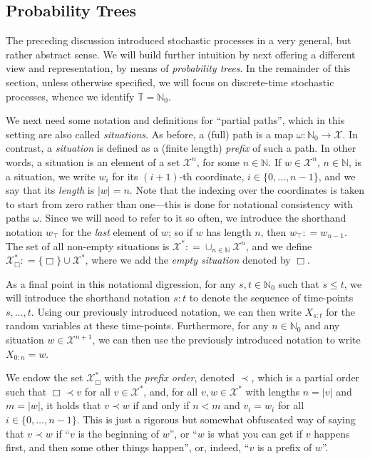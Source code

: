\documentclass[graybox]{svmult}
\newcommand{\nats}{\mathbb{N}}
\newcommand{\natswith}{\nats_{0}}
\newcommand{\states}{\mathcal{X}}
\newcommand{\coloneqq}{:\!=}
\newcommand{\timedim}{\mathbb{T}}
\begin{document}
\subsection{Probability Trees}\label{sec:prob_trees}

The preceding discussion introduced stochastic processes in a very general, but rather abstract sense. We will build further intuition by next offering a different view and representation, by means of \emph{probability trees}. In the remainder of this section, unless otherwise specified, we will focus on discrete-time stochastic processes, whence we identify $\timedim=\natswith$.

We next need some notation and definitions for ``partial paths'', which in this setting are also called \emph{situations}. As before, a (full) path is a map $\omega:\natswith\to\states$. In contrast, a \emph{situation} is defined as a (finite length) \emph{prefix} of such a path. In other words, a situation is an element of a set $\states^{n}$, for some $n\in\nats$. If $w\in\states^n$, $n\in\nats$, is a situation, we write $w_i$ for its $(i+1)$-th coordinate, $i\in\{0,\ldots,n-1\}$, and we say that its \emph{length} is $\lvert w\rvert=n$. Note that the indexing over the coordinates is taken to start from zero rather than one---this is done for notational consistency with paths $\omega$. Since we will need to refer to it so often, we introduce the shorthand notation $w_\top$ for the \emph{last} element of $w$; so if $w$ has length $n$, then $w_\top\coloneqq w_{n-1}$. The set of all non-empty situations is $\states^*\coloneqq \cup_{n\in\nats}\states^n$, and we define $\states^*_\Box\coloneqq \{\Box\}\cup\states^*$, where we add the \emph{empty situation} denoted by $\Box$.

As a final point in this notational digression, for any $s,t\in\natswith$ such that $s\leq t$, we will introduce the shorthand notation $s:t$ to denote the sequence of time-points $s,\ldots,t$. Using our previously introduced notation, we can then write $X_{s:t}$ for the random variables at these time-points. Furthermore, for any $n\in\natswith$ and any situation $w\in\states^{n+1}$, we can then use the previously introduced notation to write $X_{0:n}=w$.

We endow the set $\states^*_\Box$ with the \emph{prefix order}, denoted $\prec$, which is a partial order such that $\Box\prec v$ for all $v\in\states^*$, and, for all $v,w\in\states^*$ with lengths $n=\lvert v\rvert$ and $m=\lvert w\rvert$, it holds that $v\prec w$ if and only if $n<m$ and $v_i=w_i$ for all $i\in\{0,\ldots,n-1\}$. This is just a rigorous but somewhat obfuscated way of saying that $v\prec w$ if ``$v$ is the beginning of $w$'', or ``$w$ is what you can get if $v$ happens first, and then some other things happen'', or, indeed, ``$v$ is a prefix of $w$''.
\end{document}
